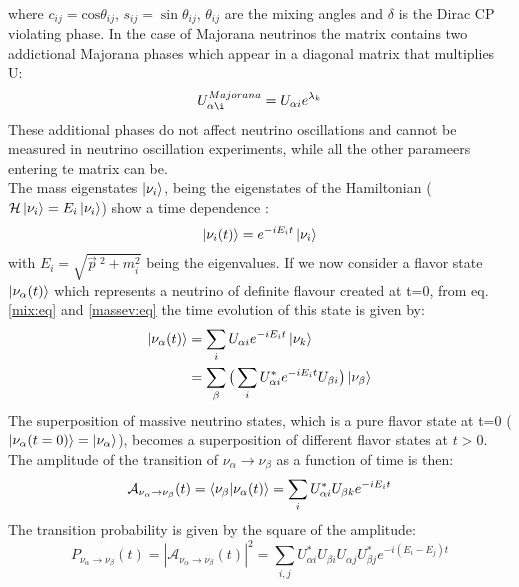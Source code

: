 \documentclass[12pt,a4paper,openright,twoside]{report}
\begin{document}
\\
where $c_{ij} =\text{cos}\theta_{ij}$, $s_{ij} =\sin\theta_{ij}$, $\theta_{ij}$ are the mixing angles and $\delta$ is the Dirac CP violating phase. In the case of Majorana neutrinos the matrix contains two addictional Majorana phases which appear in a diagonal matrix that multiplies U:
\begin{equation}
U_{\alpha \i}^{Majorana}= U_{\alpha i}e^{\lambda_k}
\end{equation} 
These additional phases do not affect neutrino oscillations and cannot be measured in neutrino oscillation experiments, while all the other parameers entering te matrix can be.\\
The mass eigenstates $\ket{\nu_i}$, being the eigenstates of the Hamiltonian ($\mathcal{H}\ket{\nu_i}=E_i\ket{\nu_i}$) show a time dependence :
\begin{equation}
\label{massev:eq}
\ket{\nu_i(t)}=e^{-iE_it}\ket{\nu_i} 
\end{equation} 
with $E_i=\sqrt{\vec{p} \ ^2+m_i^2}$ being the eigenvalues. If we now consider a flavor state $\ket{\nu_\alpha(t)}$ which represents a neutrino of definite flavour created at t=0, from eq. \ref{mix:eq} and \ref{massev:eq} the time evolution of this state is given by:
\begin{equation}
\begin{split}
\ket{\nu_\alpha(t)} & =\sum_i U_{\alpha i}e^{-iE_it}\ket{\nu_k}\\
                    & =\sum_{\beta} \big(\sum_i U_{\alpha i}^* e^{-iE_it} U_{\beta i}\big) \ket{\nu_\beta}
\end{split}
\end{equation}
The superposition of massive neutrino states, which is a pure flavor state at t=0 ($\ket{\nu_\alpha(t=0)}=\ket{\nu_\alpha}$), becomes a superposition of different flavor states at $t>0$. The amplitude of the transition of $\nu_\alpha \rightarrow \nu_\beta$ as a function of time is then:
\begin{equation}
\mathcal{A}_{\nu_\alpha \rightarrow \nu_\beta}(t)= \braket{\nu_\beta|\nu_\alpha(t)}=\sum_i U_{\alpha i}^* U_{\beta k}e^{-iE_it}
\end{equation}
The transition probability is given by the square of the amplitude:
\begin{equation}
P_{\nu_\alpha \rightarrow \nu_\beta}(t)=|\mathcal{A}_{\nu_\alpha \rightarrow \nu_\beta}(t)|^2=
\sum_{i,j}U_{\alpha i}^* U_{\beta i} U_{\alpha j}U^*_{\beta j} e^{-i(E_i-E_j)t}
\end{equation}
\end{document}
